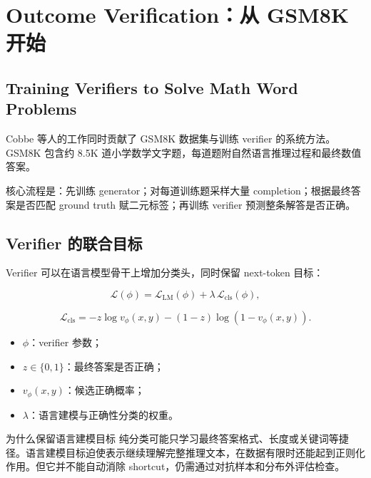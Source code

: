 \documentclass[a4paper]{article}
\begin{document}
\section{Outcome Verification：从 GSM8K 开始}

\subsection{Training Verifiers to Solve Math Word Problems}

Cobbe 等人的工作同时贡献了 GSM8K 数据集与训练 verifier 的系统方法。GSM8K 包含约 8.5K 道小学数学文字题，每道题附自然语言推理过程和最终数值答案。


核心流程是：先训练 generator；对每道训练题采样大量 completion；根据最终答案是否匹配 ground truth 赋二元标签；再训练 verifier 预测整条解答是否正确。


\subsection{Verifier 的联合目标}

Verifier 可以在语言模型骨干上增加分类头，同时保留 next-token 目标：

$$
\mathcal L(\phi)
=\mathcal L_{\mathrm{LM}}(\phi)
+\lambda\,\mathcal L_{\mathrm{cls}}(\phi),
$$

$$
\mathcal L_{\mathrm{cls}}
=-z\log v_{\phi}(x,y)-(1-z)\log(1-v_{\phi}(x,y)).
$$

\begin{itemize}
    \item $\phi$：verifier 参数；
    \item $z\in\{0,1\}$：最终答案是否正确；
    \item $v_{\phi}(x,y)$：候选正确概率；
    \item $\lambda$：语言建模与正确性分类的权重。
\end{itemize}


\begin{knowledgebox}{为什么保留语言建模目标}
纯分类可能只学习最终答案格式、长度或关键词等捷径。语言建模目标迫使表示继续理解完整推理文本，在数据有限时还能起到正则化作用。但它并不能自动消除 shortcut，仍需通过对抗样本和分布外评估检查。
\end{knowledgebox}
\end{document}
